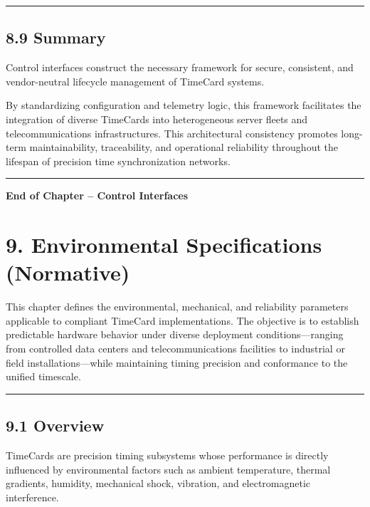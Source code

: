 \begin{center}\rule{0.5\linewidth}{0.5pt}\end{center}

\subsection{8.9 Summary}\label{summary-1}

Control interfaces construct the necessary framework for secure,
consistent, and vendor-neutral lifecycle management of TimeCard systems.

By standardizing configuration and telemetry logic, this framework
facilitates the integration of diverse TimeCards into heterogeneous
server fleets and telecommunications infrastructures. This architectural
consistency promotes long-term maintainability, traceability, and
operational reliability throughout the lifespan of precision time
synchronization networks.

\begin{center}\rule{0.5\linewidth}{0.5pt}\end{center}

\textbf{End of Chapter -- Control Interfaces}

\section{9. Environmental Specifications
(Normative)}\label{environmental-specifications-normative}

This chapter defines the environmental, mechanical, and reliability
parameters applicable to compliant TimeCard implementations. The
objective is to establish predictable hardware behavior under diverse
deployment conditions---ranging from controlled data centers and
telecommunications facilities to industrial or field
installations---while maintaining timing precision and conformance to
the unified timescale.

\begin{center}\rule{0.5\linewidth}{0.5pt}\end{center}

\subsection{9.1 Overview}\label{overview-3}

TimeCards are precision timing subsystems whose performance is directly
influenced by environmental factors such as ambient temperature, thermal
gradients, humidity, mechanical shock, vibration, and electromagnetic
interference.

